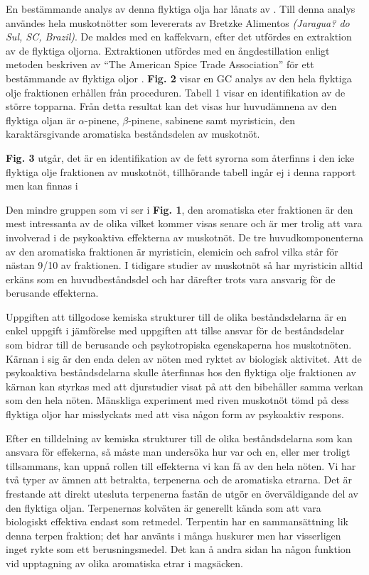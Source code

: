 \documentclass{theme/franska}
\begin{document}
En bestämmande analys av denna flyktiga olja har lånats av \cite{spricigo1999extraction}.
Till denna analys användes hela muskotnötter som levererats av Bretzke Alimentos \textit{(Jaragua? do Sul, SC, Brazil)}. De maldes med en kaffekvarn, efter det utfördes
en extraktion av de flyktiga oljorna. Extraktionen utfördes med en ångdestillation enligt metoden beskriven av ``The American Spice Trade Association'' för ett bestämmande av flyktiga oljor
\cite[citerad av Ferreira]{spricigo1999extraction}.
\textbf{Fig. 2} visar en GC analys av den hela flyktiga olje fraktionen erhållen
från proceduren. Tabell 1 visar en identifikation av de större topparna.
Från detta resultat kan det visas hur huvudämnena av den flyktiga oljan är $\alpha$-pinene, $\beta$-pinene, sabinene samt myristicin, den karaktärsgivande aromatiska beståndsdelen av muskotnöt.

\textbf{Fig. 3} utgår, det är en identifikation av de fett syrorna som återfinns i den icke flyktiga olje fraktionen av muskotnöt, tillhörande tabell ingår ej i denna rapport men kan finnas i \cite[s.258]{spricigo1999extraction}

Den mindre gruppen som vi ser i \textbf{Fig. 1}, den aromatiska
eter fraktionen är den mest intressanta av de olika vilket kommer visas senare
och är mer trolig att vara involverad i de psykoaktiva effekterna av
muskotnöt.
De tre huvudkomponenterna av den aromatiska fraktionen är myristicin, elemicin
och safrol vilka står för nästan 9/10 av fraktionen.
I tidigare studier av muskotnöt så har myristicin alltid erkäns som en
huvudbeståndsdel och har därefter trots vara ansvarig för de berusande effekterna.

Uppgiften att tillgodose kemiska strukturer till de olika beståndsdelarna är
en enkel uppgift i jämförelse med uppgiften att tillse ansvar för de
beståndsdelar som bidrar till de berusande och psykotropiska egenskaperna hos muskotnöten.
Kärnan i sig är den enda delen av nöten med ryktet av biologisk aktivitet.
Att de psykoaktiva beståndsdelarna skulle återfinnas hos den flyktiga olje fraktionen av kärnan kan styrkas med att djurstudier visat på att den bibehåller samma verkan som den hela nöten.
Mänskliga experiment med riven muskotnöt tömd på dess flyktiga oljor har
misslyckats med att visa någon form av psykoaktiv respons. \cite{truitt}

Efter en tilldelning av kemiska strukturer till de olika beståndsdelarna
som kan ansvara för effekerna, så måste man undersöka hur var och en, eller
mer troligt tillsammans, kan uppnå rollen till
effekterna vi kan få av den hela nöten.
Vi har två typer av ämnen att betrakta, terpenerna och de aromatiska etrarna.
Det är frestande att direkt utesluta terpenerna fastän de utgör en överväldigande
del av den flyktiga oljan. Terpenernas kolväten är generellt kända som att vara
biologiskt effektiva endast som retmedel.
Terpentin har en sammansättning lik denna terpen fraktion; det har använts
i många huskurer men har visserligen inget rykte som ett berusningsmedel.
Det kan å andra sidan ha någon funktion vid upptagning av olika aromatiska etrar i
magsäcken.
\end{document}
